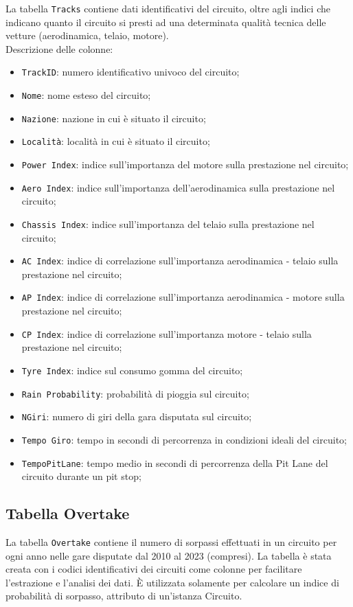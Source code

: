 La tabella \texttt{Tracks} contiene dati identificativi del circuito, oltre agli indici che indicano quanto il circuito si presti ad una determinata qualità tecnica delle vetture (aerodinamica, telaio, motore). \\
Descrizione delle colonne:
\begin{itemize}
    \item \texttt{TrackID}: numero identificativo univoco del circuito;
    \item \texttt{Nome}: nome esteso del circuito;
    \item \texttt{Nazione}: nazione in cui è situato il circuito;
    \item \texttt{Località}: località in cui è situato il circuito;
    \item \texttt{Power Index}: indice sull’importanza del motore sulla prestazione nel circuito;
    \item \texttt{Aero Index}: indice sull’importanza dell’aerodinamica sulla prestazione nel circuito;
    \item \texttt{Chassis Index}: indice sull’importanza del telaio sulla prestazione nel circuito;
    \item \texttt{AC Index}: indice di correlazione sull’importanza aerodinamica - telaio sulla prestazione nel circuito;
    \item \texttt{AP Index}: indice di correlazione sull’importanza aerodinamica - motore sulla prestazione nel circuito;
    \item \texttt{CP Index}: indice di correlazione sull’importanza motore - telaio sulla prestazione nel circuito;
    \item \texttt{Tyre Index}: indice sul consumo gomma del circuito;
    \item \texttt{Rain Probability}: probabilità di pioggia sul circuito;
    \item \texttt{NGiri}: numero di giri della gara disputata sul circuito;
    \item \texttt{Tempo Giro}: tempo in secondi di percorrenza in condizioni ideali del circuito;
    \item \texttt{TempoPitLane}: tempo medio in secondi di percorrenza della Pit Lane del circuito durante un pit stop;
\end{itemize}

\subsection{Tabella Overtake}

La tabella \texttt{Overtake} contiene il numero di sorpassi effettuati in un circuito per ogni anno nelle gare disputate dal 2010 al 2023 (compresi). La tabella è stata creata con i codici identificativi dei circuiti come colonne per facilitare l’estrazione e l’analisi dei dati. È utilizzata solamente per calcolare un indice di probabilità di sorpasso, attributo di un’istanza Circuito.


